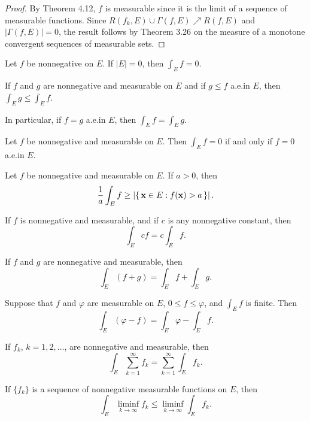 \begin{proof}
By Theorem 4.12, $f$ is measurable since it is the limit of a sequence of
measurable functions. Since $R(f_k,E)\cup\Gamma(f,E)\nearrow R(f,E)$ and
$|\Gamma(f,E)|=0$, the result follows by Theorem 3.26 on the measure of a
monotone convergent sequences of measurable sets.
\end{proof}
\begin{theorem*}[5.9]
Let $f$ be nonnegative on $E$. If $|E|=0$, then $\int_E f=0$.
\end{theorem*}
\begin{theorem*}[5.10]
If $f$ and $g$ are nonnegative and measurable on $E$ and if $g\leq f$
a.e.\@ in $E$, then $\int_E g\leq\int_E f$.

In particular, if $f=g$ a.e.\@ in $E$, then $\int_E f=\int_E g$.
\end{theorem*}
\begin{theorem*}[5.11]
Let $f$ be nonnegative and measurable on $E$. Then $\int_E f=0$ if and only
if $f=0$ a.e.\@ in $E$.
\end{theorem*}
\begin{corollary*}
Let $f$ be nonnegative and measurable on $E$. If $a>0$, then
\[
\frac{1}{a}\int_E f\geq\left|\left\{\,\mathbf{x}\in E:f(\mathbf{x})>a\,\right\}\right|.
\]
\end{corollary*}
\begin{theorem*}[5.13]
If $f$ is nonnegative and measurable, and if $c$ is any nonnegative
constant, then
\[
\int_E cf=c\int_E f.
\]
\end{theorem*}
\begin{theorem*}[5.14]
If $f$ and $g$ are nonnegative and measurable, then
\[
\int_E (f+g)=\int_E f+\int_E g.
\]
\end{theorem*}
\begin{corollary*}
Suppose that $f$ and $\varphi$ are measurable on $E$, $0\leq f\leq\varphi$,
and $\int_E f$ is finite. Then
\[
\int_E (\varphi-f)=\int_E\varphi-\int_E f.
\]
\end{corollary*}
\begin{theorem*}[5.16]
If $f_k$, $k=1,2,\dotsc$, are nonnegative and measurable, then
\[
\int_E\sum_{k=1}^\infty f_k=\sum_{k=1}^\infty\int_E f_k.
\]
\end{theorem*}
\begin{theorem*}
If $\{f_k\}$ is a sequence of nonnegative measurable functions on $E$, then
\[
  \int_E\liminf_{k\to\infty} f_k\leq\liminf_{k\to\infty}\int_E f_k.
\]
\end{theorem*}
